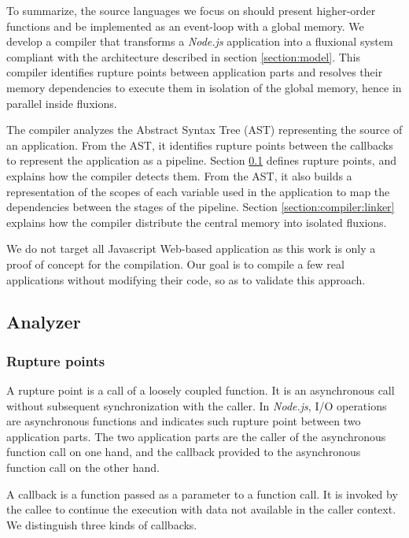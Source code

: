 To summarize, the source languages we focus on should present higher-order functions and be implemented as an event-loop with a global memory.
We develop a compiler that transforms a \textit{Node.js} application into a fluxional system compliant with the architecture described in section \ref{section:model}.
This compiler identifies rupture points between application parts and resolves their memory dependencies to execute them in isolation of the global memory, hence in parallel inside fluxions.

The compiler analyzes the Abstract Syntax Tree (AST) representing the source of an application.
From the AST, it identifies rupture points between the callbacks to represent the application as a pipeline.
Section \ref{section:compiler:analyzer} defines rupture points, and explains how the compiler detects them.
From the AST, it also builds a representation of the scopes of each variable used in the application to map the dependencies between the stages of the pipeline.
Section \ref{section:compiler:linker} explains how the compiler distribute the central memory into isolated fluxions.

We do not target all Javascript Web-based application as this work is only a proof of concept for the compilation.
Our goal is to compile a few real applications without modifying their code, so as to validate this approach.

\subsection{Analyzer} \label{section:compiler:analyzer}

\subsubsection{Rupture points} \label{section:compiler:analyzer:rupture}

A rupture point is a call of a loosely coupled function.
It is an asynchronous call without subsequent synchronization with the caller.
In \textit{Node.js}, I/O operations are asynchronous functions and indicates such rupture point between two application parts.
The two application parts are the caller of the asynchronous function call on one hand, and the callback provided to the asynchronous function call on the other hand.

A callback is a function passed as a parameter to a function call.
It is invoked by the callee to continue the execution with data not available in the caller context.
We distinguish three kinds of callbacks.


